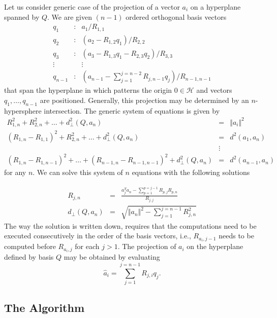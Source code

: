 \documentclass{article}
\newcommand{\sv}{Q}
\newcommand{\sve}{q}
\newcommand{\nonsve}{a}
\newcommand{\origin}{0}
\newcommand{\ce}{R}
\begin{document}
Let us consider generic case of the projection of a vector $\nonsve_{i}$
on a hyperplane spanned by $\sv$. We are given $(n-1)$ ordered orthogonal
basis vectors \begin{eqnarray*}
\sve_{1} & : & \nonsve_{1}/\ce_{1,1}\\
\sve_{2} & : & \left(\nonsve_{2}-\ce_{1,2}\sve_{1}\right)/\ce_{2,2}\\
\sve_{3} & : & \left(\nonsve_{3}-\ce_{1,3}\sve_{1}-\ce_{2,3}\sve_{2}\right)/\ce_{3,3}\\
\vdots &  & \vdots\\
\sve_{n-1} & : & \left(\nonsve_{n-1}-\sum_{j=1}^{j=n-2}\ce_{j,n-1}\sve_{j}\right)/\ce_{n-1,n-1}\end{eqnarray*}
that span the hyperplane in which patterns the origin $\origin\in\mathcal{H}$
and vectors $\sve_{1},\ldots,\sve_{n-1}$ are positioned. Generally,
this projection may be determined by an $n$-hypersphere intersection.
The generic system of equations is given by \begin{eqnarray*}
\ce_{1,n}^{2}+\ce_{2,n}^{2}+\ldots+d_{\perp}^{2}(\sv,\nonsve_{n}) & = & \Vert\nonsve_{i}\Vert^{2}\\
(\ce_{1,n}-\ce_{1,1})^{2}+\ce_{2,n}^{2}+\ldots+d_{\perp}^{2}(\sv,\nonsve_{n}) & = & d^{2}(\nonsve_{1},\nonsve_{n})\\
 & \vdots\\
(\ce_{1,n}-\ce_{1,n-1})^{2}+\ldots+(\ce_{n-1,n}-\ce_{n-1,n-1})^{2}+d_{\perp}^{2}(\sv,\nonsve_{n}) & = & d^{2}(\nonsve_{n-1},\nonsve_{n})\end{eqnarray*}
for any $n$. We can solve this system of $n$ equations with the
following solutions

\begin{eqnarray}
\ce_{j,n} & = & \frac{\nonsve_{j}^{T}\nonsve_{n}-\sum_{p=1}^{p=j-1}\ce_{p,j}\ce_{p,n}}{\ce_{j,j}}\label{equation:coord_update}\\
d_{\perp}(\sv,\nonsve_{n}) & = & \sqrt{\Vert\nonsve_{n}\Vert^{2}-\sum_{j=1}^{j=n-1}\ce_{j,n}^{2}}\label{equation:perp_distance}\end{eqnarray}
The way the solution is written down, requires that the computations
need to be executed consecutively in the order of the basis vectors,
i.e., $\ce_{\nonsve_{i},j-1}$ needs to be computed before $\ce_{\nonsve_{i},j}$
for each $j>1$. The projection of $\nonsve_{i}$ on the hyperplane
defined by basis $\sv$ may be obtained by evaluating\[
\hat{\nonsve}_{i}=\sum_{j=1}^{j=n-1}\ce_{j,i}\sve_{j}.\]


\subsection{The Algorithm\label{subsection:max_perp_algorithm}}
\end{document}
